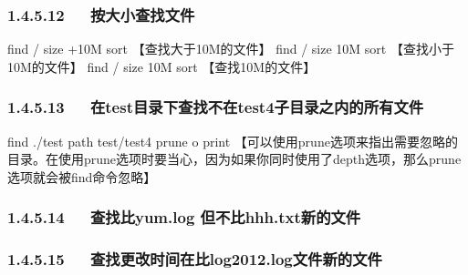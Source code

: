 \documentclass[letterpaper,12pt,english]{sphinxmanual}
\begin{document}
\subsubsection{1.4.5.12   按大小查找文件}
\label{\detokenize{001software/001install/linux:id16}}
\begin{sphinxVerbatim}[commandchars=\\\{\}]
find / \PYGZhy{}size +10M  \textbar{}sort 【查找大于10M的文件】
find / \PYGZhy{}size \PYGZhy{}10M  \textbar{}sort 【查找小于10M的文件】
find / \PYGZhy{}size 10M   \textbar{}sort  【查找10M的文件】
\end{sphinxVerbatim}


\subsubsection{1.4.5.13   在test目录下查找不在test4子目录之内的所有文件}
\label{\detokenize{001software/001install/linux:testtest4}}
\begin{sphinxVerbatim}[commandchars=\\\{\}]
find ./test \PYGZhy{}path \PYGZdq{}test/test4\PYGZdq{} \PYGZhy{}prune \PYGZhy{}o \PYGZhy{}print
【可以使用\PYGZhy{}prune选项来指出需要忽略的目录。在使用\PYGZhy{}prune选项时要当心，因为如果你同时使用了\PYGZhy{}depth选项，那么\PYGZhy{}prune选项就会被find命令忽略】
\end{sphinxVerbatim}


\subsubsection{1.4.5.14   查找比yum.log 但不比hhh.txt新的文件}
\label{\detokenize{001software/001install/linux:yum-log-hhh-txt}}
\begin{sphinxVerbatim}[commandchars=\\\{\}]
\PYG{p}{[} \PYG{p}{]}
\end{sphinxVerbatim}


\subsubsection{1.4.5.15   查找更改时间在比log2012.log文件新的文件}
\label{\detokenize{001software/001install/linux:log2012-log}}
\begin{sphinxVerbatim}[commandchars=\\\{\}]
   
\end{sphinxVerbatim}
\end{document}
